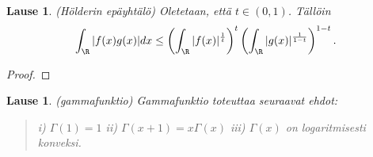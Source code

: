 \documentclass[12pt]{article}
\theoremstyle{definition}
\theoremstyle{plain}
\newtheorem{lause}[maar]{Lause}
\begin{document}
\begin{lause}
(Hölderin epäyhtälö) Oletetaan, että $t \in (0,1)$. Tällöin 
\begin{equation}
    \int_\R |f(x)g(x)|dx \le \left( \int_\R |f(x)|^{\frac{1}{t}} \right)^{t}\left( \int_\R |g(x)|^{\frac{1}{1-t}}\right)^{1-t}.
\end{equation}
\end{lause}
\begin{proof}

\end{proof}

\begin{lause}
(gammafunktio) Gammafunktio  toteuttaa seuraavat ehdot:
\begin{quote}
    i) $\Gamma(1)=1$ \newline
    ii) $\Gamma(x+1)=x\Gamma(x)$ \newline
    iii) $\Gamma(x)$ on logaritmisesti konveksi.
\end{quote}
\end{lause}
\end{document}
